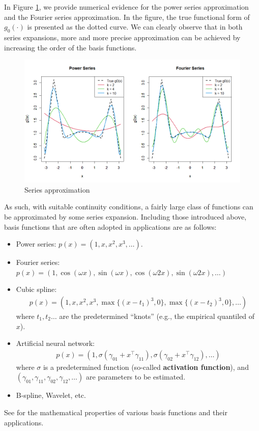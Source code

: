 \documentclass[10.5pt, A4paper, openany, uplatex]{book}
\numberwithin{equation}{section}
\begin{document}
In Figure \ref{fig:seriesreg}, we provide numerical evidence for the power series approximation and the Fourier series approximation.
In the figure, the true functional form of $g_0(\cdot)$ is presented as the dotted curve.
We can clearly observe that in both series expansions, more and more precise approximation can be achieved by increasing the order of the basis functions.

\begin{figure}[h!]
	\begin{center}
		\includegraphics[width = 17cm]{seriesreg.png}
		\caption{Series approximation}\label{fig:seriesreg}
	\end{center}
\end{figure}

As such, with suitable continuity conditions, a fairly large class of functions can be approximated by some series expansion.
Including those introduced above, basis functions that are often adopted in applications are as follows:
\begin{itemize}
	\item Power series: $p(x) = (1, x, x^2, x^3, \ldots)$.
	\item Fourier series: $p(x) = (1, \cos(\omega x), \sin(\omega x), \cos(\omega 2 x), \sin(\omega 2 x), \ldots)$
	\item Cubic spline: 
	\begin{align*}
		p(x) = (1, x, x^2, x^3, \max\{(x - t_1)^3, 0\}, \max\{(x - t_2)^3, 0\},\ldots)
	\end{align*}
	where $t_1, t_2 \ldots$ are the predetermined ``knots'' (e.g., the empirical quantiled of $x$).
	\item Artificial neural network:
	\begin{align*}
		p(x) = (1, \sigma(\gamma_{01} + x^\top\gamma_{11}), \sigma(\gamma_{02} + x^\top\gamma_{12}), \ldots)
	\end{align*}
	where $\sigma$ is a predetermined function (so-called \textbf{activation function}), and $(\gamma_{01}, \gamma_{11}, \gamma_{02}, \gamma_{12}, \ldots)$ are parameters to be estimated.
	\item B-spline, Wavelet, etc.
\end{itemize}
See \cite{chen2007large} for the mathematical properties of various basis functions and their applications.
\end{document}
